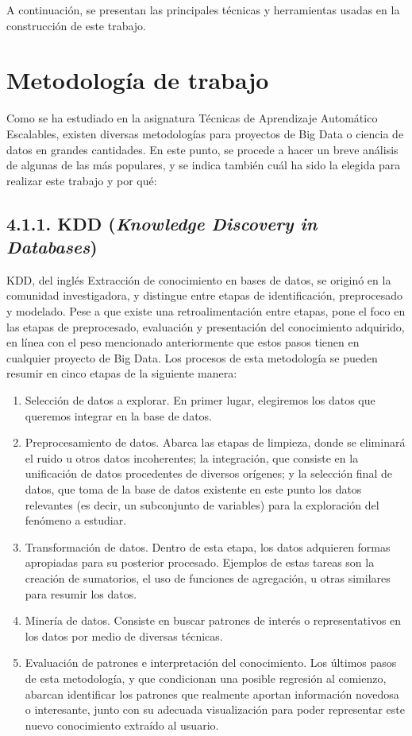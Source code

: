 
A continuación, se presentan las principales técnicas y herramientas usadas en la construcción de este trabajo.

\section{Metodología de trabajo}

Como se ha estudiado en la asignatura \guillemotleft Técnicas de Aprendizaje Automático Escalables\guillemotright, existen diversas metodologías para proyectos de Big Data o ciencia de datos en grandes cantidades. En este punto, se procede a hacer un breve análisis de algunas de las más populares, y se indica también cuál ha sido la elegida para realizar este trabajo y por qué:

\subsection{4.1.1. KDD (\textit{Knowledge Discovery in Databases})}

KDD, del inglés \guillemotleft Extracción de conocimiento en bases de datos\guillemotright, se originó en la comunidad investigadora, y distingue entre etapas de identificación, preprocesado y modelado. Pese a que existe una retroalimentación entre etapas, pone el foco en las etapas de preprocesado, evaluación y presentación del conocimiento adquirido, en línea con el peso mencionado anteriormente que estos pasos tienen en cualquier proyecto de Big Data. Los procesos de esta metodología se pueden resumir en cinco etapas de la siguiente manera:

\begin{enumerate}
    \item Selección de datos a explorar. En primer lugar, elegiremos los datos que queremos integrar en la base de datos.
    \item Preprocesamiento de datos. Abarca las etapas de limpieza, donde se eliminará el ruido u otros datos incoherentes; la integración, que consiste en la unificación de datos procedentes de diversos orígenes; y la selección final de datos, que toma de la base de datos existente en este punto los datos relevantes (es decir, un subconjunto de variables) para la exploración del fenómeno a estudiar.
    \item Transformación de datos. Dentro de esta etapa, los datos adquieren formas apropiadas para su posterior procesado. Ejemplos de estas tareas son la creación de sumatorios, el uso de funciones de agregación, u otras similares para resumir los datos.
    \item Minería de datos. Consiste en buscar patrones de interés o representativos en los datos por medio de diversas técnicas.
    \item Evaluación de patrones e interpretación del conocimiento. Los últimos pasos de esta metodología, y que condicionan una posible regresión al comienzo, abarcan identificar los patrones que realmente aportan información novedosa o interesante, junto con su adecuada visualización para poder representar este nuevo conocimiento extraído al usuario.
\end{enumerate}

